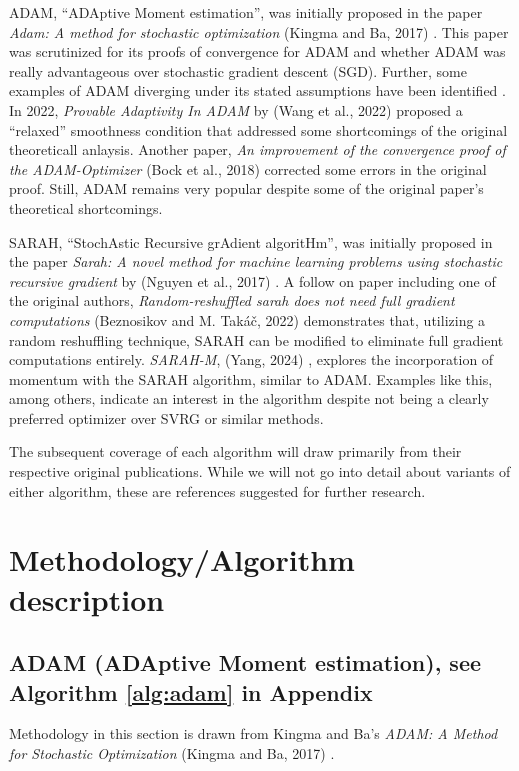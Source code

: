 \documentclass[letterpaper,11 pt]{article}
\begin{document}
ADAM, “ADAptive Moment estimation”, was initially proposed in the paper \textit{Adam: A method for stochastic optimization} (Kingma and Ba, 2017) \cite{kingma}.  This paper was scrutinized for its proofs of convergence for ADAM and whether ADAM was really advantageous over stochastic gradient descent (SGD).  Further, some examples of ADAM diverging under its stated assumptions have been identified \cite{reddidivergence}.  In 2022, \textit{Provable Adaptivity In ADAM} by (Wang et al., 2022) \cite{wangprovable} proposed a “relaxed” smoothness condition that addressed some shortcomings of the original theoreticall anlaysis.  Another paper, \textit{An improvement of the convergence proof of the ADAM-Optimizer} (Bock et al., 2018) \cite{inproceedings} corrected some errors in the original proof.  Still, ADAM remains very popular despite some of the original paper's theoretical shortcomings. 

SARAH, “StochAstic Recursive grAdient algoritHm”, was initially proposed in the paper \textit{Sarah: A novel method for machine learning problems using stochastic recursive gradient} by (Nguyen et al., 2017) \cite{nguyen}.  A follow on paper including  one of the original authors, \textit{Random-reshuffled sarah does not need full gradient computations} (Beznosikov and M. Takáč, 2022) \cite{Beznosikov} demonstrates that, utilizing a random reshuffling technique, SARAH can be modified to eliminate full gradient computations entirely.  \textit{SARAH-M}, (Yang, 2024) \cite{sarahm}, explores the incorporation of momentum with the SARAH algorithm, similar to ADAM.  Examples like this, among others, indicate an interest in the algorithm despite not being a clearly preferred optimizer over SVRG or similar methods.

The subsequent coverage of each algorithm will draw primarily from their respective original publications. While we will not go into detail about variants of either algorithm, these are references suggested for further research.




\section{Methodology/Algorithm description}\label{sec:method}

\subsection{ ADAM (ADAptive Moment estimation), see Algorithm \ref{alg:adam} in Appendix}
Methodology in this section is drawn from Kingma and Ba's \textit{ADAM: A Method for Stochastic Optimization} (Kingma and Ba, 2017)  \cite{kingma}.
\end{document}

